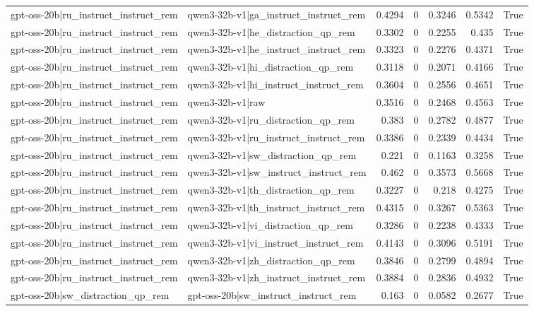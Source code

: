 \begin{table}
\begin{tabular}{l l r r r r l}
gpt-oss-20b|ru_instruct_instruct_rem & qwen3-32b-v1|ga_instruct_instruct_rem & 0.4294 & 0 & 0.3246 & 0.5342 & True \\
gpt-oss-20b|ru_instruct_instruct_rem & qwen3-32b-v1|he_distraction_qp_rem & 0.3302 & 0 & 0.2255 & 0.435 & True \\
gpt-oss-20b|ru_instruct_instruct_rem & qwen3-32b-v1|he_instruct_instruct_rem & 0.3323 & 0 & 0.2276 & 0.4371 & True \\
gpt-oss-20b|ru_instruct_instruct_rem & qwen3-32b-v1|hi_distraction_qp_rem & 0.3118 & 0 & 0.2071 & 0.4166 & True \\
gpt-oss-20b|ru_instruct_instruct_rem & qwen3-32b-v1|hi_instruct_instruct_rem & 0.3604 & 0 & 0.2556 & 0.4651 & True \\
gpt-oss-20b|ru_instruct_instruct_rem & qwen3-32b-v1|raw & 0.3516 & 0 & 0.2468 & 0.4563 & True \\
gpt-oss-20b|ru_instruct_instruct_rem & qwen3-32b-v1|ru_distraction_qp_rem & 0.383 & 0 & 0.2782 & 0.4877 & True \\
gpt-oss-20b|ru_instruct_instruct_rem & qwen3-32b-v1|ru_instruct_instruct_rem & 0.3386 & 0 & 0.2339 & 0.4434 & True \\
gpt-oss-20b|ru_instruct_instruct_rem & qwen3-32b-v1|sw_distraction_qp_rem & 0.221 & 0 & 0.1163 & 0.3258 & True \\
gpt-oss-20b|ru_instruct_instruct_rem & qwen3-32b-v1|sw_instruct_instruct_rem & 0.462 & 0 & 0.3573 & 0.5668 & True \\
gpt-oss-20b|ru_instruct_instruct_rem & qwen3-32b-v1|th_distraction_qp_rem & 0.3227 & 0 & 0.218 & 0.4275 & True \\
gpt-oss-20b|ru_instruct_instruct_rem & qwen3-32b-v1|th_instruct_instruct_rem & 0.4315 & 0 & 0.3267 & 0.5363 & True \\
gpt-oss-20b|ru_instruct_instruct_rem & qwen3-32b-v1|vi_distraction_qp_rem & 0.3286 & 0 & 0.2238 & 0.4333 & True \\
gpt-oss-20b|ru_instruct_instruct_rem & qwen3-32b-v1|vi_instruct_instruct_rem & 0.4143 & 0 & 0.3096 & 0.5191 & True \\
gpt-oss-20b|ru_instruct_instruct_rem & qwen3-32b-v1|zh_distraction_qp_rem & 0.3846 & 0 & 0.2799 & 0.4894 & True \\
gpt-oss-20b|ru_instruct_instruct_rem & qwen3-32b-v1|zh_instruct_instruct_rem & 0.3884 & 0 & 0.2836 & 0.4932 & True \\
gpt-oss-20b|sw_distraction_qp_rem & gpt-oss-20b|sw_instruct_instruct_rem & 0.163 & 0 & 0.0582 & 0.2677 & True \\

\end{tabular}
\end{table}
